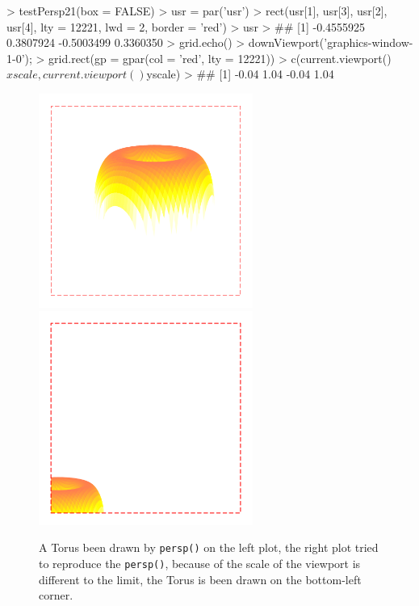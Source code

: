 \documentclass[paper=a4, fontsize=11pt]{report}
\begin{document}
\begin{Schunk}
\begin{Sinput}
> testPersp21(box = FALSE)
> usr = par('usr')
> rect(usr[1], usr[3], usr[2], usr[4], lty = 12221, lwd = 2, border = 'red')
> usr
> ## [1] -0.4555925  0.3807924 -0.5003499  0.3360350
> grid.echo()
> downViewport('graphics-window-1-0'); 
> grid.rect(gp = gpar(col = 'red', lty = 12221))
> c(current.viewport()$xscale, current.viewport()$yscale)
> ## [1] -0.04  1.04 -0.04  1.04
\end{Sinput}
\end{Schunk}

\begin{figure}[h]
\begin{center}
  \includegraphics[height = 7cm, width = 7cm]{figure/gridGraphics_persp_demo_viewport_1.pdf}
  \includegraphics[height = 7cm, width = 7cm]{figure/gridGraphics_persp_demo_viewport_2.pdf}
  \caption{A Torus been drawn by \texttt{persp()} on the left plot, the right plot tried to reproduce the \texttt{persp()}, because of the scale of the viewport is different to the limit, the Torus is been drawn on the bottom-left corner.}
  	\label{figure8}
\end{center}
\end{figure}
\end{document}
